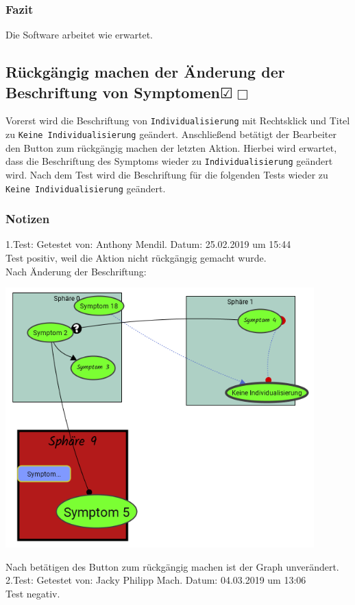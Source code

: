 \documentclass[enabledeprecatedfontcommands]{scrartcl}
\newcommand{\subsectiont}[2]{\subsection[#1]{#1{\normalsize\normalfont #2}}}
\newcommand{\leer}{$\Box$}
\newcommand{\ok}{$\CheckedBox$}
\begin{document}
\subsubsection{Fazit}
Die Software arbeitet wie erwartet.

\subsectiont{Rückgängig machen der Änderung der \\Beschriftung von Symptomen}{\dotfill\XBox\ok\leer}
Vorerst wird die Beschriftung von \texttt{Individualisierung} mit Rechtsklick und Titel zu \texttt{Keine Individualisierung} geändert. Anschließend betätigt der Bearbeiter den Button zum rückgängig machen der letzten Aktion. Hierbei wird erwartet, dass die Beschriftung des Symptoms wieder zu \texttt{Individualisierung} geändert wird. Nach dem Test wird die Beschriftung für die folgenden Tests wieder zu \texttt{Keine Individualisierung} geändert.
\subsubsection{Notizen}
1.Test: Getestet von: Anthony Mendil. Datum: 25.02.2019 um 15:44 \\
Test positiv, weil die Aktion nicht rückgängig gemacht wurde. \\
Nach Änderung der Beschriftung: 
\begin{center}
\includegraphics[height=10cm]{3_48.PNG}
\end{center}
Nach betätigen des Button zum rückgängig machen ist der Graph unverändert. \\
2.Test: Getestet von: Jacky Philipp Mach. Datum: 04.03.2019 um 13:06 \\
Test negativ.\\
\end{document}

